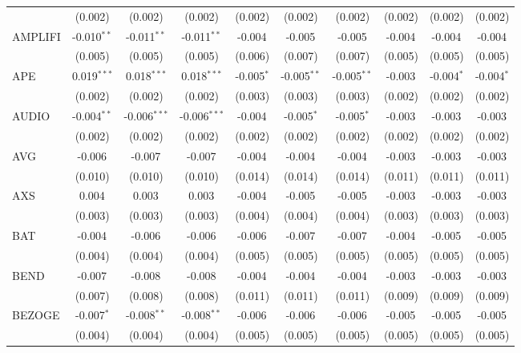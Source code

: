 \begin{table}[!htbp]
\begin{tabular}{@{\extracolsep{5pt}}lccccccccc}
  & (0.002) & (0.002) & (0.002) & (0.002) & (0.002) & (0.002) & (0.002) & (0.002) & (0.002) \\
 AMPLIFI & -0.010$^{**}$ & -0.011$^{**}$ & -0.011$^{**}$ & -0.004$^{}$ & -0.005$^{}$ & -0.005$^{}$ & -0.004$^{}$ & -0.004$^{}$ & -0.004$^{}$ \\
  & (0.005) & (0.005) & (0.005) & (0.006) & (0.007) & (0.007) & (0.005) & (0.005) & (0.005) \\
 APE & 0.019$^{***}$ & 0.018$^{***}$ & 0.018$^{***}$ & -0.005$^{*}$ & -0.005$^{**}$ & -0.005$^{**}$ & -0.003$^{}$ & -0.004$^{*}$ & -0.004$^{*}$ \\
  & (0.002) & (0.002) & (0.002) & (0.003) & (0.003) & (0.003) & (0.002) & (0.002) & (0.002) \\
 AUDIO & -0.004$^{**}$ & -0.006$^{***}$ & -0.006$^{***}$ & -0.004$^{}$ & -0.005$^{*}$ & -0.005$^{*}$ & -0.003$^{}$ & -0.003$^{}$ & -0.003$^{}$ \\
  & (0.002) & (0.002) & (0.002) & (0.002) & (0.002) & (0.002) & (0.002) & (0.002) & (0.002) \\
 AVG & -0.006$^{}$ & -0.007$^{}$ & -0.007$^{}$ & -0.004$^{}$ & -0.004$^{}$ & -0.004$^{}$ & -0.003$^{}$ & -0.003$^{}$ & -0.003$^{}$ \\
  & (0.010) & (0.010) & (0.010) & (0.014) & (0.014) & (0.014) & (0.011) & (0.011) & (0.011) \\
 AXS & 0.004$^{}$ & 0.003$^{}$ & 0.003$^{}$ & -0.004$^{}$ & -0.005$^{}$ & -0.005$^{}$ & -0.003$^{}$ & -0.003$^{}$ & -0.003$^{}$ \\
  & (0.003) & (0.003) & (0.003) & (0.004) & (0.004) & (0.004) & (0.003) & (0.003) & (0.003) \\
 BAT & -0.004$^{}$ & -0.006$^{}$ & -0.006$^{}$ & -0.006$^{}$ & -0.007$^{}$ & -0.007$^{}$ & -0.004$^{}$ & -0.005$^{}$ & -0.005$^{}$ \\
  & (0.004) & (0.004) & (0.004) & (0.005) & (0.005) & (0.005) & (0.005) & (0.005) & (0.005) \\
 BEND & -0.007$^{}$ & -0.008$^{}$ & -0.008$^{}$ & -0.004$^{}$ & -0.004$^{}$ & -0.004$^{}$ & -0.003$^{}$ & -0.003$^{}$ & -0.003$^{}$ \\
  & (0.007) & (0.008) & (0.008) & (0.011) & (0.011) & (0.011) & (0.009) & (0.009) & (0.009) \\
 BEZOGE & -0.007$^{*}$ & -0.008$^{**}$ & -0.008$^{**}$ & -0.006$^{}$ & -0.006$^{}$ & -0.006$^{}$ & -0.005$^{}$ & -0.005$^{}$ & -0.005$^{}$ \\
  & (0.004) & (0.004) & (0.004) & (0.005) & (0.005) & (0.005) & (0.005) & (0.005) & (0.005) \\

\end{tabular}
\end{table}
